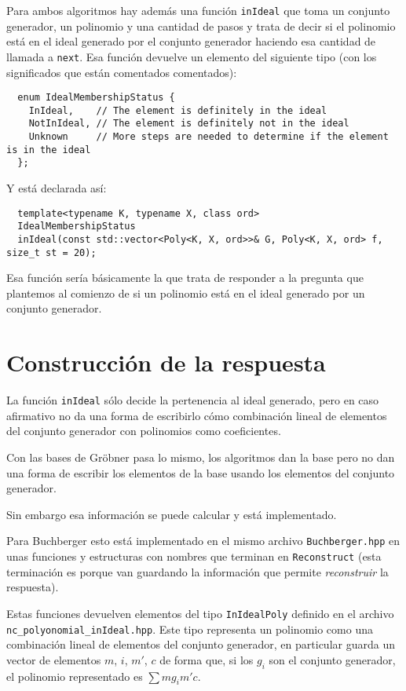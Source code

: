\documentclass[12pt]{report}
\theoremstyle{customstyle}
\theoremstyle{factstyle}
\begin{document}
Para ambos algoritmos hay además una función \texttt{inIdeal} que toma un conjunto generador, un polinomio y una cantidad de pasos y trata de decir si el polinomio está en el ideal generado por el conjunto generador haciendo esa cantidad de llamada a \texttt{next}. Esa función devuelve un elemento del siguiente tipo (con los significados que están comentados comentados):

\begin{verbatim}
  enum IdealMembershipStatus {
    InIdeal,    // The element is definitely in the ideal
    NotInIdeal, // The element is definitely not in the ideal
    Unknown     // More steps are needed to determine if the element is in the ideal
  };
\end{verbatim}

\noindent Y está declarada así:

\begin{verbatim}
  template<typename K, typename X, class ord>
  IdealMembershipStatus
  inIdeal(const std::vector<Poly<K, X, ord>>& G, Poly<K, X, ord> f, size_t st = 20);
\end{verbatim}

Esa función sería básicamente la que trata de responder a la pregunta que plantemos al comienzo de si un polinomio está en el ideal generado por un conjunto generador.

\section{Construcción de la respuesta}\label{section:construcción de la respuesta (librería)}

La función \texttt{inIdeal} sólo decide la pertenencia al ideal generado, pero en caso afirmativo no da una forma de escribirlo cómo combinación lineal de elementos del conjunto generador con polinomios como coeficientes.

Con las bases de Gröbner pasa lo mismo, los algoritmos dan la base pero no dan una forma de escribir los elementos de la base usando los elementos del conjunto generador.

Sin embargo esa información se puede calcular y está implementado.

Para Buchberger esto está implementado en el mismo archivo \texttt{Buchberger.hpp} en unas funciones y estructuras con nombres que terminan en \texttt{Reconstruct} (esta terminación es porque van guardando la información que permite \emph{reconstruir} la respuesta).

Estas funciones devuelven elementos del tipo \texttt{InIdealPoly} definido en el archivo \texttt{nc\_polyonomial\_inIdeal.hpp}. Este tipo representa un polinomio como una combinación lineal de elementos del conjunto generador, en particular guarda un vector de elementos $m$, $i$, $m'$, $c$ de forma que, si los $g_i$ son el conjunto generador, el polinomio representado es $∑ m g_i m' c$.
\end{document}
